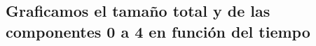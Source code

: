 \documentclass[11pt]{article}
\begin{document}
    \begin{center}
    \end{center}
    { \hspace*{\fill} \\}
    
    \begin{center}
    \end{center}
    { \hspace*{\fill} \\}
    
    \begin{center}
    \end{center}
    { \hspace*{\fill} \\}
    
    \subsection{Graficamos el tamaño total y de las componentes 0 a 4 en
función del
tiempo}\label{graficamos-el-tamauxf1o-total-y-de-las-componentes-0-a-4-en-funciuxf3n-del-tiempo}
\end{document}
